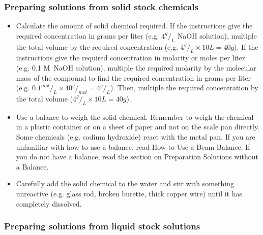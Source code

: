 \subsubsection{Preparing solutions from solid stock chemicals}

\begin{itemize}

\item{Calculate the amount of solid chemical required. If the instructions give the required concentration in grams per liter (e.g. $ 4 ^g/_L $ NaOH solution), multiple the total volume by the required concentration (e.g. $ 4 ^g/_L \times 10 L = 40 g $). If the instructions give the required concentration in molarity or moles per liter (e.g. 0.1 M~NaOH solution), multiple the required molarity by the molecular mass of the compound to find the required concentration in grams per liter (e.g. $ 0.1 ^{mol}/_L \times 40 ^g/_{mol} = 4 ^g/_L $). Then, multiple the required concentration by the total volume ($ 4 ^g/_L \times 10 L = 40g $).}

\item{Use a balance to weigh the solid chemical. Remember to weigh the chemical in a plastic container or on a sheet of paper and not on the scale pan directly. Some chemicals (e.g. sodium hydroxide) react with the metal pan. If you are unfamiliar with how to use a balance, read How to Use a Beam Balance. If you do not have a balance, read the section on Preparation Solutions without a Balance.}

\item{Carefully add the solid chemical to the water and stir with something unreactive (e.g. glass rod, broken burette, thick copper wire) until it has completely dissolved.}

\end{itemize}

\subsubsection{Preparing solutions from liquid stock solutions}

